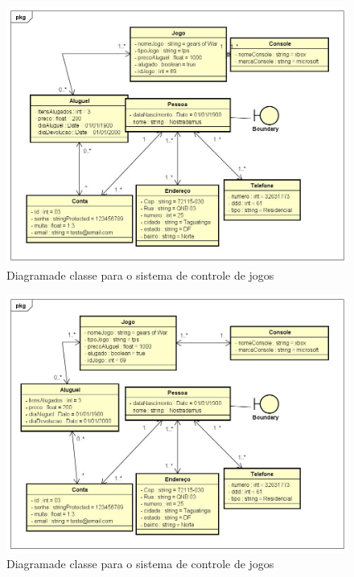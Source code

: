 \documentclass[a4paper,10pt]{article}
\begin{document}

\begin{figure}%
\center
\includegraphics[width=.7\columnwidth]{SistemaDeControleDeLocadoraDeJogos/UML/ClassDiagram.jpg}%
\caption{Diagramade classe para o sistema de controle de jogos}%
\label{fig:Jogo:classDeUso}%
\end{figure}


\begin{figure}%
\center
\includegraphics[width=.7\columnwidth]{SistemaDeControleDeLocadoraDeJogos/UML/InsstaceDiagram.jpg}%
\caption{Diagramade classe para o sistema de controle de jogos}%
\label{fig:Jogo:classDeUso}%
\end{figure}



\pagebreak

 
\end{document}

